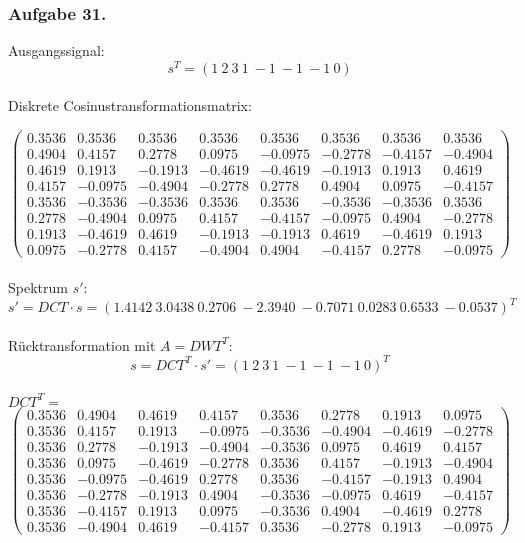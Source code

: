 \documentclass[a4paper,12pt]{article}
\newcommand{\ex}[1]{\newpage\subsubsection*{Aufgabe #1.}}
\begin{document}
	\ex{31}
	
	Ausgangssignal:
	\[ s^T = (1\ 2\ 3\ 1\ -1\ -1\ -1\ 0) \]\\
	
	Diskrete Cosinustransformationsmatrix:
	
	
	\[\left(\begin{array}{rrrrrrrr}
	0.3536 & 0.3536 & 0.3536 & 0.3536 & 0.3536 & 0.3536 & 0.3536 & 0.3536 \\
	0.4904 & 0.4157 & 0.2778 & 0.0975 &-0.0975 &-0.2778 &-0.4157 &-0.4904 \\
	0.4619 & 0.1913 & -0.1913 & -0.4619 & -0.4619 & -0.1913 & 0.1913 & 0.4619 \\
	0.4157 & -0.0975 & -0.4904 & -0.2778 & 0.2778 & 0.4904 & 0.0975 & -0.4157 \\
	0.3536 & -0.3536 & -0.3536 & 0.3536 & 0.3536 & -0.3536 & -0.3536 & 0.3536 \\
	0.2778 & -0.4904 & 0.0975 & 0.4157 & -0.4157 & -0.0975 & 0.4904 & -0.2778 \\
	0.1913 & -0.4619 & 0.4619 & -0.1913 & -0.1913 & 0.4619 & -0.4619 & 0.1913 \\
	0.0975 & -0.2778 & 0.4157 & -0.4904 & 0.4904 & -0.4157 & 0.2778 & -0.0975
	\end{array}\right)\]\\
	
	Spektrum $s'$:
	\[s' = DCT \cdot s = (1.4142\ 3.0438\ 0.2706\ -2.3940\ -0.7071\ 0.0283\ 0.6533\ -0.0537)^T\]\\
	
	
	Rücktransformation mit $A = DWT^T$:
	\[ s = DCT^T \cdot s' = (1\ 2\ 3\ 1\ -1\ -1\ -1\ 0)^T \]\\
	
	$DCT^T=$
	\[\left(\begin{array}{rrrrrrrr}
	0.3536 & 0.4904 & 0.4619 & 0.4157 & 0.3536 & 0.2778 & 0.1913 & 0.0975 \\
	0.3536 & 0.4157 & 0.1913 & -0.0975 &-0.3536 &-0.4904 &-0.4619 &-0.2778 \\
	0.3536 & 0.2778 & -0.1913 & -0.4904 & -0.3536 & 0.0975 & 0.4619 & 0.4157 \\
	0.3536 & 0.0975 & -0.4619 & -0.2778 & 0.3536 & 0.4157 & -0.1913 & -0.4904 \\
	0.3536 & -0.0975 & -0.4619 & 0.2778 & 0.3536 & -0.4157 & -0.1913 & 0.4904 \\
	0.3536 & -0.2778 & -0.1913 & 0.4904 & -0.3536 & -0.0975 & 0.4619 & -0.4157 \\
	0.3536 & -0.4157 & 0.1913 & 0.0975 & -0.3536 & 0.4904 & -0.4619 & 0.2778 \\
	0.3536 & -0.4904 & 0.4619 & -0.4157 & 0.3536 & -0.2778 & 0.1913 & -0.0975
	\end{array}\right)\]
	
\end{document}
